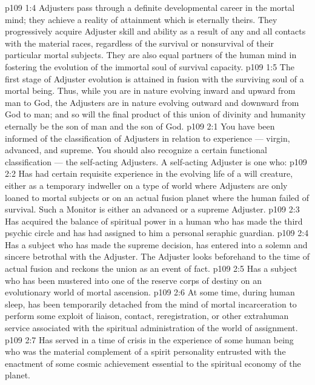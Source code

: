 \vs p109 1:4 Adjusters pass through a definite developmental career in the mortal mind; they achieve a reality of attainment which is eternally theirs. They progressively acquire Adjuster skill and ability as a result of any and all contacts with the material races, regardless of the survival or nonsurvival of their particular mortal subjects. They are also equal partners of the human mind in fostering the evolution of the immortal soul of survival capacity.
\vs p109 1:5 The first stage of Adjuster evolution is attained in fusion with the surviving soul of a mortal being. Thus, while you are in nature evolving inward and upward from man to God, the Adjusters are in nature evolving outward and downward from God to man; and so will the final product of this union of divinity and humanity eternally be the son of man and the son of God.
\vs p109 2:1 You have been informed of the classification of Adjusters in relation to experience --- virgin, advanced, and supreme. You should also recognize a certain functional classification --- the self\hyp{}acting Adjusters. A self\hyp{}acting Adjuster is one who:
\vs p109 2:2 \bibnobreakspace Has had certain requisite experience in the evolving life of a will creature, either as a temporary indweller on a type of world where Adjusters are only loaned to mortal subjects or on an actual fusion planet where the human failed of survival. Such a Monitor is either an advanced or a supreme Adjuster.
\vs p109 2:3 \bibnobreakspace Has acquired the balance of spiritual power in a human who has made the third psychic circle and has had assigned to him a personal seraphic guardian.
\vs p109 2:4 \bibnobreakspace Has a subject who has made the supreme decision, has entered into a solemn and sincere betrothal with the Adjuster. The Adjuster looks beforehand to the time of actual fusion and reckons the union as an event of fact.
\vs p109 2:5 \bibnobreakspace Has a subject who has been mustered into one of the reserve corps of destiny on an evolutionary world of mortal ascension.
\vs p109 2:6 \bibnobreakspace At some time, during human sleep, has been temporarily detached from the mind of mortal incarceration to perform some exploit of liaison, contact, reregistration, or other extrahuman service associated with the spiritual administration of the world of assignment.
\vs p109 2:7 \bibnobreakspace Has served in a time of crisis in the experience of some human being who was the material complement of a spirit personality entrusted with the enactment of some cosmic achievement essential to the spiritual economy of the planet.
